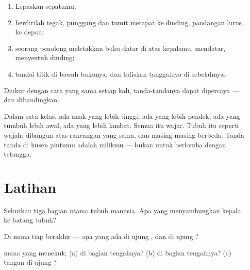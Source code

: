 \begin{method}\label{met:g1:my-body:measure}
\begin{enumerate}
  \item Lepaskan sepatumu;
  \item berdirilah tegak, punggung dan tumit merapat ke dinding,
        pandangan lurus ke depan;
  \item seorang penolong meletakkan buku datar di atas kepalamu,
        mendatar, menyentuh dinding;
  \item tandai titik di bawah bukunya, dan tuliskan tanggalnya di
        sebelahnya.
\end{enumerate}
Diukur dengan cara yang sama setiap kali, tanda-tandanya dapat
dipercaya --- dan dibandingkan.
\end{method}

\begin{remark}\label{rem:g1:my-body:different}
Dalam satu kelas, ada anak yang lebih tinggi, ada yang lebih pendek;
ada yang tumbuh lebih awal, ada yang lebih lambat. Semua itu wajar.
Tubuh itu seperti wajah: dibangun atas rancangan yang sama, dan
masing-masing berbeda. Tanda-tanda di kusen pintumu adalah milikmu ---
bukan untuk berlomba dengan tetangga.
\end{remark}

\section{Latihan}

\begin{exercise}[$\star$]\label{exo:g1:my-body:1}
Sebutkan tiga bagian utama tubuh manusia. Apa yang menyambungkan
kepala ke batang tubuh?
\end{exercise}

\begin{exercise}[$\star$]\label{exo:g1:my-body:2}
Di mana tiap  berakhir --- apa yang ada di ujung ,
dan di ujung ?
\end{exercise}

\begin{exercise}[$\star$]\label{exo:g1:my-body:3}
 mana yang menekuk: (a)  di bagian tengahnya? (b) 
di bagian tengahnya? (c) tangan di ujung ?
\end{exercise}

